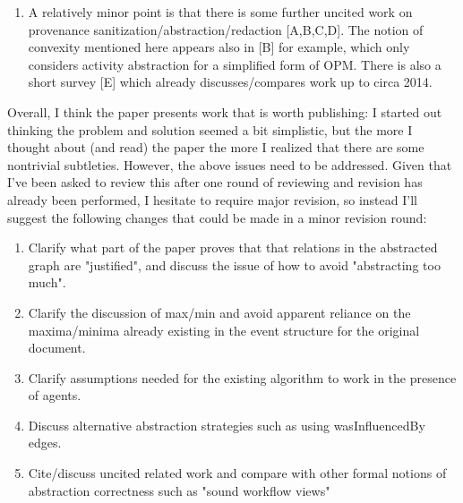 \documentclass{article}
\newcommand{\showComments}{yes} %
\newcommand{\com}[2]{\ifthenelse{\equal{\showComments}{yes}}{\textcolor{#1}{#2}}{}}
\newcommand{\comment}[1]{\com{red}{#1}}
\begin{document}
\begin{enumerate}
\item A relatively minor point is that there is some further uncited work on provenance sanitization/abstraction/redaction [A,B,C,D].  The notion of convexity mentioned here appears also in [B] for example, which only considers activity abstraction for a simplified form of OPM.  There is also a short survey [E] which already discusses/compares work up to circa 2014.

\comment{Only A and B are mentioned below. Maybe we could track the others down, or ask the editor for clarification? PM to do a lit survey. } 
\end{enumerate}


Overall, I think the paper presents work that is worth publishing: I started out thinking the problem and solution seemed a bit simplistic, but the more I thought about (and read) the paper the more I realized that there are some nontrivial subtleties.  However, the above issues need to be addressed.  Given that I've been asked to review this after one round of reviewing and revision has already been performed, I hesitate to require major revision, so instead I'll suggest the following changes that could be made in a minor revision round:

\begin{enumerate}

\item Clarify what part of the paper proves that that relations in the abstracted graph are "justified", and discuss the issue of how to avoid "abstracting too much".

\comment{I think we can answer this, as I suggest in answer to Point 1. JWB to do.}

\item Clarify the discussion of max/min and avoid apparent reliance on the maxima/minima already existing in the event structure for the original document.

  \comment{Dont' know here PM to do.}

  
\item Clarify assumptions needed for the existing algorithm to work in the presence of agents.

\comment{OK - mainly that the node types are disjoint JWB to do.}
  
\item Discuss alternative abstraction strategies such as using wasInfluencedBy edges.

  \comment{A brief discussion with a point forward to Blue/Collapse paper? I've forgotten how we agreed to deal with this.}
  
\item Cite/discuss uncited related work and compare with other formal notions of abstraction correctness such as "sound workflow views"

 \comment{perhaps do a search for these. PM to do lit survey.}
  
\end{enumerate}
\end{document}
